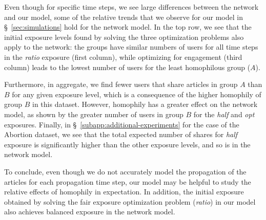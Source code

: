 \documentclass[letterpaper]{article} %
\begin{document}
Even though for specific time steps, we see large differences between the network and our model, some of the relative trends that we observe for our model in \S~\ref{sec:simulations} hold for the network model. 
In the top row, we see that the initial exposure levels found by solving the three optimization problems also apply to the network: the groups have similar numbers of users for all time steps in the \textit{ratio} exposure (first column), while optimizing for engagement (third column) leads to the lowest number of users for the least homophilous group ($A$).

Furthermore, in aggregate, we find fewer users that share articles in group $A$ than $B$ for any given exposure level, which is a consequence of the higher homophily of group $B$ in this dataset.
However, homophily has a greater effect on the network model, as shown by the greater number of users in group $B$ for the \textit{half} and \textit{opt} exposures.
Finally, in \S~\ref{subapp:additional-experiments} for the case of the Abortion dataset, we see that the total expected number of shares for \textit{half} exposure is significantly higher than the other exposure levels, and so is in the network model.

To conclude, even though we do not accurately model the propagation of the articles for each propagation time step, our model may be helpful to study the relative effects of homophily in expectation. In addition, the initial exposure obtained by solving the fair exposure optimization problem (\textit{ratio}) in our model also achieves balanced exposure in the network model.
\end{document}
